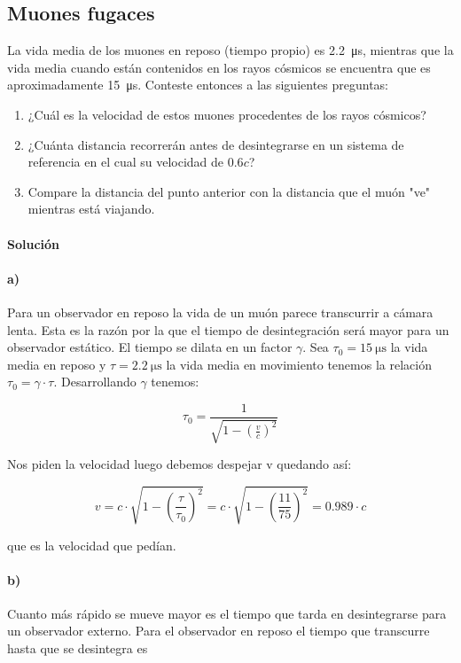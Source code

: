 \documentclass[12pt, a4paper]{article}
\begin{document}
        \subsection{Muones fugaces}
        La vida media de los muones en reposo (tiempo propio) es \SI{2.2}{\micro\second}, mientras
        que la vida media cuando están contenidos en los rayos cósmicos se encuentra que es aproximadamente
        \SI{15}{\micro\second}. Conteste entonces a las siguientes preguntas:
        \begin{enumerate}[label=\alph*)]
        \item ¿Cuál es la velocidad de estos muones procedentes de los rayos cósmicos?
        \item ¿Cuánta distancia recorrerán antes de desintegrarse en un sistema de referencia
        en el cual su velocidad de $\num{0.6}c$?
        \item Compare la distancia del punto anterior con la distancia que el muón "ve"
        mientras está viajando.
        \end{enumerate}

        \paragraph{\textbf{Solución}}
        \paragraph{a)} Para un observador en reposo la vida de un muón parece transcurrir a cámara lenta. Esta es
        la razón por la que el tiempo de desintegración será mayor para un observador estático.
        El tiempo se dilata en un factor $\gamma$. Sea $\tau_0 = \SI{15}{\micro\second}$ la vida
        media en reposo y $\tau = \SI{2.2}{\micro\second}$ la vida media en movimiento tenemos la
        relación $\tau_0 = \gamma \cdot \tau$. Desarrollando $\gamma$ tenemos:

        $$\tau_0 = \frac{1}{\sqrt{1-\left(\frac{v}{c}\right)^2}}$$

        Nos piden la velocidad luego debemos despejar v quedando así:


        $$v = c \cdot \sqrt{1-\left(\frac{\tau}{\tau_0}\right)^2} = c \cdot \sqrt{1-\left(\frac{11}{75}\right)^2} = \num{0.989}\cdot c$$

        que es la velocidad que pedían.

        \paragraph{b)} Cuanto más rápido se mueve mayor es el tiempo que tarda en
        desintegrarse para un observador externo. Para el observador en reposo el tiempo que transcurre hasta que se desintegra es
\end{document}
